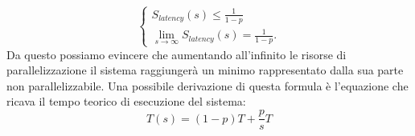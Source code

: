   $$\begin{cases}
    S_{latency}(s) \leq \frac{1}{1 - p} \\
    \lim\limits_{s \to \infty} S_{latency}(s) = \frac{1}{1 - p}.
    \end{cases}$$
  Da questo possiamo evincere che aumentando all'infinito le risorse di parallelizzazione il sistema raggiungerà un minimo rappresentato
  dalla sua parte non parallelizzabile.
  Una possibile derivazione di questa formula è l'equazione che ricava il
  tempo teorico di esecuzione del sistema:
  $$T(s) = (1-p)T + \frac{p}{s}T$$
  
  
